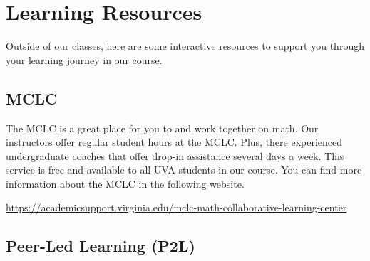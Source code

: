 \documentclass[12pt]{article}
\begin{document}
	\section{Learning Resources}

        Outside of our classes, here are some interactive resources to support you through your learning journey in our course.


        
        


        
        \subsection{MCLC}

        The MCLC is a great place for you to and work together on math. Our instructors offer regular student hours at the MCLC. Plus, there experienced undergraduate coaches that offer drop-in assistance several days a week. This service is free and available to all UVA students in our course. You can find more information about the MCLC in the following website.

        \href{https://academicsupport.virginia.edu/mclc-math-collaborative-learning-center}{https://academicsupport.virginia.edu/mclc-math-collaborative-learning-center}

        \subsection{Peer-Led Learning (P2L)}
        
\end{document}
